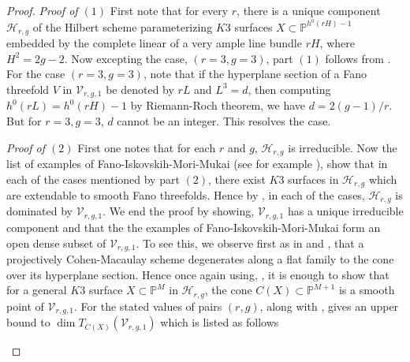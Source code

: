 \documentclass[11pt,twoside]{amsart}
\theoremstyle{plain}
\numberwithin{equation}{section}
\theoremstyle{definition}
\begin{document}
\begin{proof}
  \noindent\textit{Proof of $(1)$} First note that for every $r$, there is a unique component $\mathcal{H}_{r,g}$ of the Hilbert scheme parameterizing $K3$ surfaces $X \subset \mathbb{P}^{h^0(rH)-1}$ embedded by the complete linear of a very ample line bundle $rH$, where $H^2 = 2g-2$. Now excepting the case, $(r = 3, g = 3)$, part $(1)$ follows from . For the case $(r=3, g=3)$, note that if the hyperplane section of a Fano threefold $V$ in  $\mathcal{V}_{r,g,1}$ be denoted by $rL$ and $L^3 = d$, then computing $h^0(rL) = h^0(rH)-1$ by Riemann-Roch theorem, we have $d = 2(g-1)/r$. But for $r = 3, g = 3$, $d$ cannot be an integer. This resolves the case. \par
  \textit{Proof of $(2)$} First one notes that for each $r$ and $g$, $\mathcal{H}_{r,g}$ is irreducible. Now the list of examples of Fano-Iskovskih-Mori-Mukai (see for example \cite[Table $3.1$]{CLM98}), show that in each of the cases mentioned by part $(2)$, there exist $K3$ surfaces in $\mathcal{H}_{r,g}$ which are extendable to smooth Fano threefolds. Hence by , in each of the cases, $\mathcal{H}_{r,g}$ is dominated by $\mathcal{V}_{r,g,1}$. We end the proof by showing, $\mathcal{V}_{r,g,1}$ has a unique irreducible component and that the the examples of Fano-Iskovskih-Mori-Mukai form an open dense subset of $\mathcal{V}_{r,g,1}$.  To see this, we observe first as in \cite{CLM93} and \cite{CLM98}, that a projectively Cohen-Macaulay scheme degenerates along a flat family to the cone over its hyperplane section. Hence once again using, , it is enough to show that for a general $K3$ surface $X \subset \mathbb{P}^{M}$ in $\mathcal{H}_{r,g}$, the cone $C(X) \subset \mathbb{P}^{M+1}$ is a smooth point of $\mathcal{V}_{r,g,1}$. For the stated values of pairs $(r,g)$, 
   along with , gives an upper bound to $\operatorname{dim}T_{C(X)}(\mathcal{V}_{r,g,1})$ which is listed as follows 
  \begin{enumerate}



\end{enumerate}
\end{proof}
\end{document}

